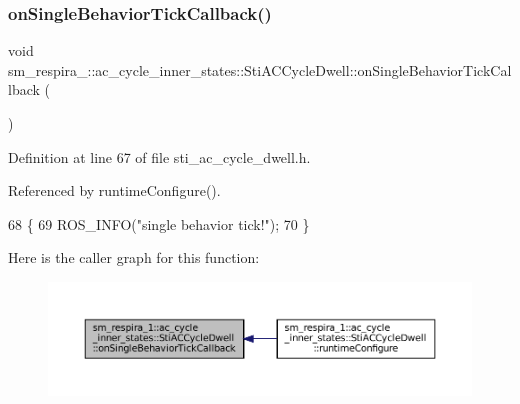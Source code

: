 \subsubsection{\texorpdfstring{on\+Single\+Behavior\+Tick\+Callback()}{onSingleBehaviorTickCallback()}}
{\footnotesize\ttfamily void sm\+\_\+respira\+\_\+::ac\+\_\+cycle\+\_\+inner\+\_\+states\+::\+Sti\+A\+C\+Cycle\+Dwell\+::on\+Single\+Behavior\+Tick\+Callback (\begin{DoxyParamCaption}{ }\end{DoxyParamCaption})\hspace{0.3cm}{\ttfamily [inline]}}



Definition at line 67 of file sti\+\_\+ac\+\_\+cycle\+\_\+dwell.\+h.



Referenced by runtime\+Configure().


\begin{DoxyCode}
68   \{
69     ROS\_INFO(\textcolor{stringliteral}{"single behavior tick!"});
70   \}
\end{DoxyCode}
Here is the caller graph for this function\+:
\nopagebreak
\begin{figure}[H]
\begin{center}
\leavevmode
\includegraphics[width=350pt]{structsm__respira__1_1_1ac__cycle__inner__states_1_1StiACCycleDwell_ae47401c4b2d0388058438bc85cccfbba_icgraph}
\end{center}
\end{figure}
\mbox{\label{structsm__respira__1_1_1ac__cycle__inner__states_1_1StiACCycleDwell_a8543bc0af22558db94fffb3f89d52816}} 
